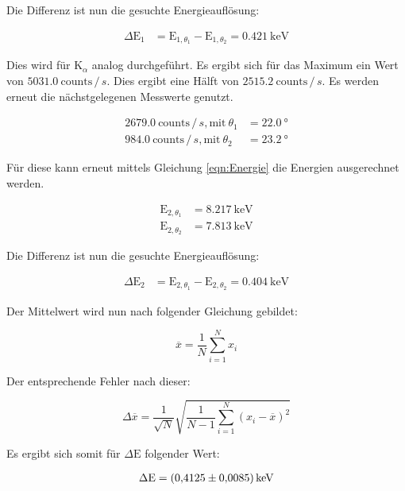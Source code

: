 Die Differenz ist nun die gesuchte Energieauflösung:

\begin{align*}
  \Delta \text{E}_1 &= \text{E}_{1, \theta_1} - \text{E}_{1, \theta_2} = \SI{0.421}{\kilo\electronvolt}
\end{align*}

Dies wird für K$_\alpha$ analog durchgeführt.
Es ergibt sich für das Maximum ein Wert von $5031.0\ \text{counts} \, / \, s$.
Dies ergibt eine Hälft von $2515.2\ \text{counts} \, / \, s$.
Es werden erneut die nächstgelegenen Messwerte genutzt.

\begin{align*}
  2679.0\ \text{counts} \, / \, s, \text{mit}\ \theta_1 &= \SI{22.0}{\degree} \\
  984.0\ \text{counts} \, / \, s, \text{mit}\ \theta_2 &= \SI{23.2}{\degree}
\end{align*}

Für diese kann erneut mittels Gleichung \eqref{eqn:Energie} die Energien ausgerechnet werden.

\begin{align*}
  \text{E}_{2, \theta_1} &= \SI{8.217}{\kilo\electronvolt} \\
  \text{E}_{2, \theta_2} &= \SI{7.813}{\kilo\electronvolt}
\end{align*}

Die Differenz ist nun die gesuchte Energieauflösung:

\begin{align*}
  \Delta \text{E}_2 &= \text{E}_{2, \theta_1} - \text{E}_{2, \theta_2} = \SI{0.404}{\kilo\electronvolt}
\end{align*}

Der Mittelwert wird nun nach folgender Gleichung gebildet:

\begin{equation}
  \label{eqn:mittelwert}
  \overline{x} = \frac{1}{N} \sum_{i=1}^N x_i
\end{equation}

Der entsprechende Fehler nach dieser:

\begin{equation}
  \label{eqn:mittelwertfehler}
  \Delta \overline{x} = \frac{1}{\sqrt{N}} \sqrt{\frac{1}{N-1} \sum_{i=1}^N (x_i - \overline{x})^2}
\end{equation}

Es ergibt sich somit für $\Delta\text{E}$ folgender Wert:

\begin{align*}
  \Delta\text{E} = \SI{0.4125\pm0.0085}{\kilo\electronvolt}
\end{align*}


